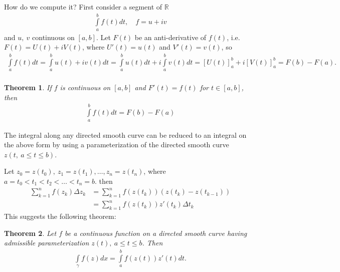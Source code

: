 \documentclass[12pt, a4paper]{article}
\theoremstyle{plain}
\newtheorem{thm}{Theorem} %
\theoremstyle{definition}
\begin{document}
			How do we compute it? First consider a segment of $\mathbb{R}$
			\begin{align*}
				\int\limits_{a}^{b}f(t)dt,\quad f=u+iv
			\end{align*}
			and $u,\:v$ continuous on $[a,b]$. Let $F(t)$ be an anti-derivative of $f(t)$, i.e. $F(t) = U(t)+iV(t)$, where $U'(t) = u(t)$ and $V'(t) = v(t)$, so
			\begin{align*}
				\int\limits_{a}^{b}f(t)dt = 
				\int\limits_{a}^{b}u(t)+iv(t)dt =
				\int\limits_{a}^{b}u(t)dt +
				i\int\limits_{a}^{b}v(t)dt =
				\left[U(t)\right]_a^b + i\left[V(t)\right]_a^b = F(b)-F(a).\\
			\end{align*}

			\begin{thm}
				If $f$ is continuous on $[a,b]$ and $F'(t)=f(t)$ for $t\in[a,b]$, then
				\begin{align*}
					\int\limits_{a}^{b}f(t)dt = F(b)-F(a)
				\end{align*}
			\end{thm}

			The integral along any directed smooth curve can be reduced to an integral on the above form by using a parameterization of the directed smooth curve $z(t,\: a\le t \le b)$.

			Let $z_0 = z(t_0),\:z_1=z(t_1),\ldots,z_n = z(t_n)$, where $a=t_0<t_1<t_2<\ldots<t_n=b$. then
			\begin{align*}
				\sum\limits_{k=1}^{n}f(z_k)\Delta z_k &=
				\sum\limits_{k=1}^{n}f(z(t_k))(z(t_k)-z(t_{k-1}))\tag*{Riemann sum for $f(z(t))z'(t)$}\\ &=
				\sum\limits_{k=1}^{n}f(z(t_k))z'(t_k)\Delta t_k
			\end{align*}
			This suggests the following theorem:\\

			\begin{thm}
				Let $f$ be a continuous function on a directed smooth curve having admissible parameterization $z(t),\:a\le t\le b$. Then
				\begin{align*}
					\int\limits_{\gamma}f(z)dx = \int\limits_{a}^{b}f(z(t))z'(t)dt.\\
				\end{align*}
			\end{thm}
\end{document}
